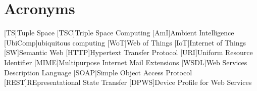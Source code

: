 


\chapter*{Acronyms}

\begin{acronym}
  [TS]{Tuple Space}
  [TSC]{Triple Space Computing}
  [AmI]{Ambient Intelligence}
  [UbiComp]{ubiquitous computing}
  [WoT]{Web of Things}
  [IoT]{Internet of Things}
  [SW]{Semantic Web}
  [HTTP]{Hypertext Transfer Protocol}
  [URI]{Uniform Resource Identifier}
  [MIME]{Multipurpose Internet Mail Extensions}
  [WSDL]{Web Services Description Language}
  [SOAP]{Simple Object Access Protocol}
  [REST]{REpresentational State Transfer} %
  [DPWS]{Device Profile for Web Services}
\end{acronym}

